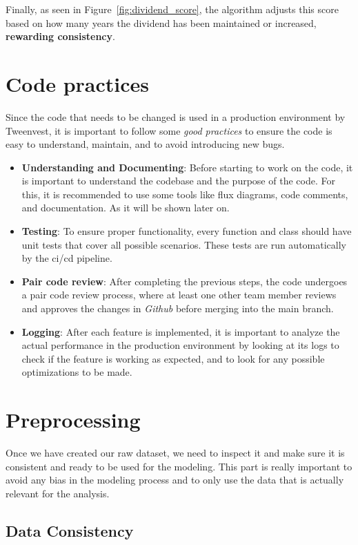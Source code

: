 \documentclass[11pt,english,a4paper,hidelinks]{book}
\begin{document}
\noindent Finally, as seen in Figure~\ref{fig:dividend_score}, the algorithm adjusts this score based on how many years the dividend has been maintained or increased, \textbf{rewarding consistency}.

\section{Code practices}
Since the code that needs to be changed is used in a production environment by Tweenvest, it is important to follow some \textit{good practices} to ensure the code is easy to understand, maintain, and to avoid introducing new bugs.

\begin{itemize}
  \item \textbf{Understanding and Documenting}: Before starting to work on the code, it is important to understand the codebase and the purpose of the code. For this, it is recommended to use some tools like flux diagrams, code comments, and documentation. As it will be shown later on.
  \item \textbf{Testing}: To ensure proper functionality, every function and class should have unit tests that cover all possible scenarios. These tests are run automatically by the \acrshort{ci/cd} pipeline.
  \item \textbf{Pair code review}: After completing the previous steps, the code undergoes a pair code review process, where at least one other team member reviews and approves the changes in \textit{Github} before merging into the main branch.
  \item \textbf{Logging}: After each feature is implemented, it is important to analyze the actual performance in the production environment by looking at its logs to check if the feature is working as expected, and to look for any possible optimizations to be made.
\end{itemize}

\section{Preprocessing}

Once we have created our raw dataset, we need to inspect it and make sure it is consistent and ready to be used for the modeling. This part is really important to avoid any bias in the modeling process and to only use the data that is actually relevant for the analysis.

\subsection{Data Consistency}
\end{document}
